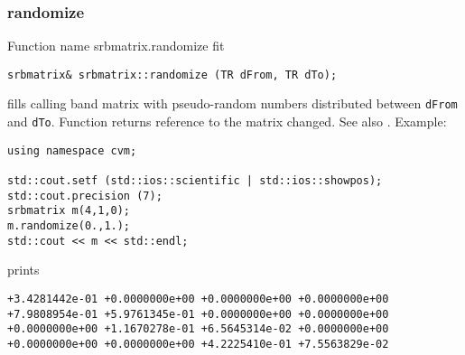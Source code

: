\subsubsection{randomize}
Function%
\pdfdest name {srbmatrix.randomize} fit
\begin{verbatim}
srbmatrix& srbmatrix::randomize (TR dFrom, TR dTo);
\end{verbatim}
fills  calling band matrix with pseudo-random numbers distributed between
\verb"dFrom" and \verb"dTo".
Function
returns  reference to the matrix changed.
See also
.
Example:
\begin{Verbatim}
using namespace cvm;

std::cout.setf (std::ios::scientific | std::ios::showpos);
std::cout.precision (7);
srbmatrix m(4,1,0);
m.randomize(0.,1.);
std::cout << m << std::endl;
\end{Verbatim}
prints
\begin{Verbatim}
+3.4281442e-01 +0.0000000e+00 +0.0000000e+00 +0.0000000e+00
+7.9808954e-01 +5.9761345e-01 +0.0000000e+00 +0.0000000e+00
+0.0000000e+00 +1.1670278e-01 +6.5645314e-02 +0.0000000e+00
+0.0000000e+00 +0.0000000e+00 +4.2225410e-01 +7.5563829e-02
\end{Verbatim}
\newpage

